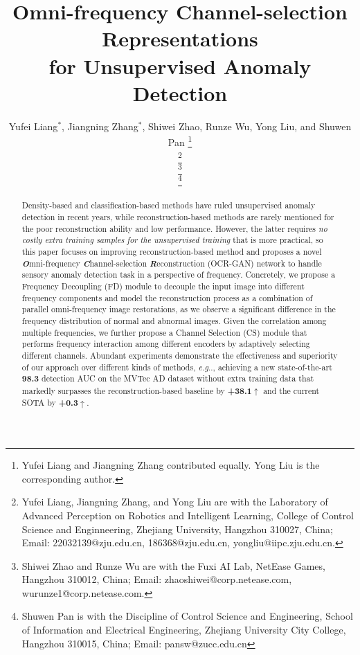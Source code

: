 \documentclass[lettersize,journal]{IEEEtran}
\makeatletter
\DeclareRobustCommand\onedot{\futurelet\@let@token\@onedot}
\def\@onedot{\ifx\@let@token.\else.\null\fi\xspace}
\def\eg{\emph{e.g}\onedot} \def\Eg{\emph{E.g}\onedot}
\makeatother
\begin{document}
\title{Omni-frequency Channel-selection Representations \\for Unsupervised Anomaly Detection}

\author{Yufei Liang$^*$, Jiangning Zhang$^*$, Shiwei Zhao, Runze Wu, Yong Liu, and Shuwen Pan
\thanks{Yufei Liang and Jiangning Zhang contributed equally. Yong Liu is the corresponding author.}

\thanks{Yufei Liang, Jiangning Zhang, and Yong Liu are with the Laboratory of Advanced Perception on Robotics and Intelligent Learning, College of Control Science and Enginneering, Zhejiang University, Hangzhou 310027, China; Email: 22032139@zju.edu.cn, 186368@zju.edu.cn, yongliu@iipc.zju.edu.cn.}

\thanks{Shiwei Zhao and Runze Wu are with the Fuxi AI Lab, NetEase Games, Hangzhou 310012, China; Email: zhaoshiwei@corp.netease.com, wurunze1@corp.netease.com.}

\thanks{Shuwen Pan is with the Discipline of Control Science and Engineering, School of Information and Electrical Engineering, Zhejiang University City College, Hangzhou 310015, China; Email: pansw@zucc.edu.cn}

}





\maketitle

\begin{abstract}
Density-based and classification-based methods have ruled unsupervised anomaly detection in recent years, while reconstruction-based methods are rarely mentioned for the poor reconstruction ability and low performance. However, the latter requires \emph{no costly extra training samples for the unsupervised training} that is more practical, so this paper focuses on improving reconstruction-based method and proposes a novel \textit{\textbf{O}}mni-frequency \textit{\textbf{C}}hannel-selection \textit{\textbf{R}}econstruction (OCR-GAN) network to handle sensory anomaly detection task in a perspective of frequency. Concretely, we propose a Frequency Decoupling (FD) module to decouple the input image into different frequency components and model the reconstruction process as a combination of parallel omni-frequency image restorations, as we observe a significant difference in the frequency distribution of normal and abnormal images. Given the correlation among multiple frequencies, we further propose a Channel Selection (CS) module that performs frequency interaction among different encoders by adaptively selecting different channels. Abundant experiments demonstrate the effectiveness and superiority of our approach over different kinds of methods, \eg, achieving a new state-of-the-art \textbf{98.3} detection AUC on the MVTec AD dataset without extra training data that markedly surpasses the reconstruction-based baseline by \textbf{+38.1}$\uparrow$ and the current SOTA by \textbf{+0.3}$\uparrow$. 
\end{abstract}
\end{document}
